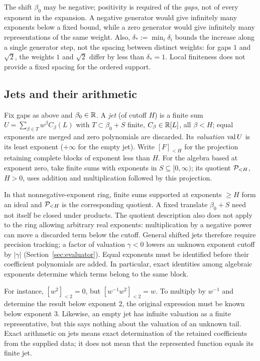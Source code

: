 The shift $\beta_0$ may be negative; positivity is required of the
\emph{gaps}, not of every exponent in the expansion. A negative generator
would give infinitely many exponents below a fixed bound, while a zero
generator would give infinitely many representations of the same weight.
Also, $\delta_*:=\min_i\delta_i$ bounds the increase along a single
generator step, not the spacing between distinct weights: for gaps $1$
and $\sqrt2$, the weights $1$ and $\sqrt2$ differ by less than
$\delta_*=1$. Local finiteness does not provide a fixed spacing for the
ordered support.

\subsection{Jets and their arithmetic}

\begin{definition}[Jets]
Fix gaps as above and $\beta_0\in\mathbb R$. A \emph{jet} (of cutoff $H$) is a finite sum $U=\sum_{\beta\in T}w^\beta C_\beta(L)$ with $T\subset\beta_0+S$ finite, $C_\beta\in\mathbb R[L]$, all $\beta<H$; equal exponents are merged and zero polynomials are discarded. Its \emph{valuation} $\operatorname{val} U$ is its least exponent ($+\infty$ for the empty jet).
Write $[F]_{<H}$ for the projection retaining complete blocks of exponent
less than $H$. For the algebra based at exponent zero, take finite sums
with exponents in $S\subseteq[0,\infty)$; its quotient $\mathcal P_{<H}$,
$H>0$, uses addition and multiplication followed by this projection.
\end{definition}

In that nonnegative-exponent ring, finite sums supported at exponents
$\ge H$ form an ideal and $\mathcal P_{<H}$ is the corresponding quotient.
A fixed translate $\beta_0+S$ need not itself be closed under products.
The quotient description also does not apply to the ring allowing arbitrary
real exponents: multiplication by a negative power can move a discarded term
below the cutoff. General shifted jets therefore require precision tracking;
a factor of valuation $\gamma<0$ lowers an unknown exponent cutoff by
$|\gamma|$ (Section~\ref{sec:evaluator}). Equal exponents must be identified
before their coefficient polynomials are added. In particular, exact
identities among algebraic exponents determine which terms belong to the
same block.

For instance, $[w^2]_{<2}=0$, but
$[w^{-1}w^2]_{<2}=w$. To multiply by $w^{-1}$ and determine the result
below exponent $2$, the original expression must be known below exponent
$3$. Likewise, an empty jet has infinite valuation as a finite
representative, but this says nothing about the valuation of an unknown
tail. Exact arithmetic on jets means exact determination of the retained
coefficients from the supplied data; it does not mean that the represented
function equals its finite jet.

